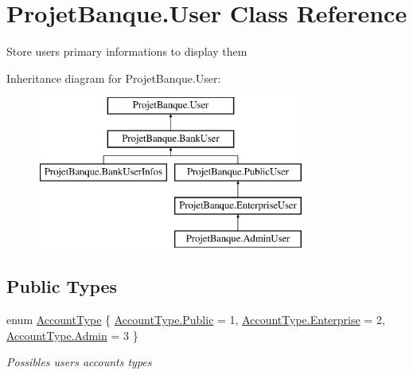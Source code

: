 \hypertarget{class_projet_banque_1_1_user}{}\section{Projet\+Banque.\+User Class Reference}
\label{class_projet_banque_1_1_user}


Store user\textquotesingle{}s primary informations to display them  


Inheritance diagram for Projet\+Banque.\+User\+:\begin{figure}[H]
\begin{center}
\leavevmode
\includegraphics[height=5.000000cm]{class_projet_banque_1_1_user}
\end{center}
\end{figure}
\subsection*{Public Types}
\begin{DoxyCompactItemize}
\item 
enum \mbox{\hyperlink{class_projet_banque_1_1_user_a3ab673599238173c9d0ef40e731c0437}{Account\+Type}} \{ \mbox{\hyperlink{class_projet_banque_1_1_user_a3ab673599238173c9d0ef40e731c0437a3d067bedfe2f4677470dd6ccf64d05ed}{Account\+Type.\+Public}} = 1, 
\mbox{\hyperlink{class_projet_banque_1_1_user_a3ab673599238173c9d0ef40e731c0437aa0f27638260642afb474516cc918407e}{Account\+Type.\+Enterprise}} = 2, 
\mbox{\hyperlink{class_projet_banque_1_1_user_a3ab673599238173c9d0ef40e731c0437ae3afed0047b08059d0fada10f400c1e5}{Account\+Type.\+Admin}} = 3
 \}
\begin{DoxyCompactList}\small\item\em Possibles user\textquotesingle{}s accounts types \end{DoxyCompactList}\end{DoxyCompactItemize}
